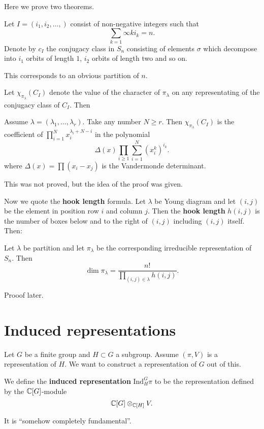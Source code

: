 \documentclass[11pt, english]{article}
\begin{document}
Here we prove two theorems. 

Let $I=(i_1,i_2,\ldots,)$ consist of non-negative integers such that
$$
\sum_{k=1}\infty ki_k=n.
$$
Denote by $c_I$ the conjugacy class in $S_n$ consisting of elements $\sigma$ which decompose into $i_1$ orbits of length $1$, $i_2$ orbits of length two and so on. 

This corresponds to an obvious partition of $n$.

Let $\chi_{\pi_\lambda}(C_I)$ denote the value of the character of $\pi_\lambda$ on any representating of the conjugacy class of $C_I$. Then
\begin{thm}
  
Assume $\lambda=(\lambda_1,\ldots,\lambda_r)$. Take any number $N \geq r$. Then $\chi_{\pi_\lambda}(C_I)$ is the coefficient of $\prod_{i=1}^N x_i^{\lambda_i+N-i}$ in the polynomial
$$
\Delta(x) \prod_{i \geq 1} \sum_{i=1}^N (x_i^k)^{i_k}.
$$
where $\Delta(x) = \prod (x_i-x_j)$ is the Vandermonde determinant.
\end{thm}

This was not proved, but the idea of the proof was given.

Now we quote the \textbf{hook length} formula. Let $\lambda$ be Young diagram and let $(i,j)$ be the element in position row $i$ and column $j$. Then the \textbf{hook length} $h(i,j)$ is the number of boxes below and to the right of $(i,j)$ including $(i,j)$ itself. Then:

\begin{thm}
  Let $\lambda$ be partition and let $\pi_\lambda$ be the corresponding irreducible representation of $S_n$. Then 
$$
\dim \pi_\lambda = \frac{n!}{\prod_{(i,j) \in \lambda} h(i,j)}.
$$
\end{thm}

Prooof later.


\section{Induced representations}

Let $G$ be a finite group and $H \subset G$ a subgroup. Assume $(\pi,V)$ is a representation of $H$. We want to construct a representation of $G$ out of this.

We define the \textbf{induced representation} $\mathrm{Ind}_H^G \pi$ to be the representation defined by the $\mathbb{C}[G]$-module
$$
\mathbb{C}[G] \otimes_{\mathbb{C}[H]} V.
$$

It is ``somehow completely fundamental''.
\end{document}
